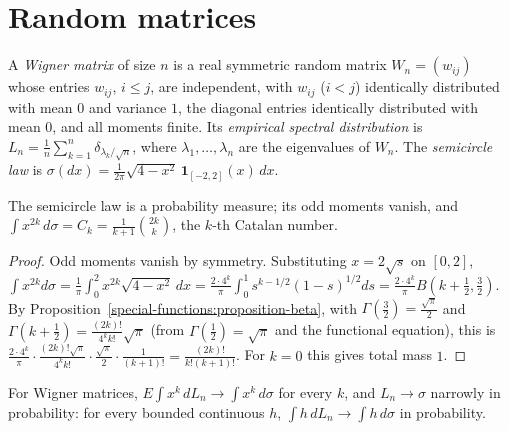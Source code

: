 \section{Random matrices}\label{probability:section-random-matrices}

\begin{definition}\label{probability:definition-wigner}
A \emph{Wigner matrix} of size $n$ is a real symmetric random matrix $W_n = (w_{ij})$ whose entries $w_{ij}$, $i \leq j$, are independent, with $w_{ij}$ ($i < j$) identically distributed with mean $0$ and variance $1$, the diagonal
entries identically distributed with mean $0$, and all moments finite. Its \emph{empirical spectral distribution} is $L_n = \frac1n\sum_{k=1}^n\delta_{\lambda_k/\sqrt n}$, where $\lambda_1, \ldots, \lambda_n$ are the eigenvalues of $W_n$.
The \emph{semicircle law} is $\sigma(dx) = \frac{1}{2\pi}\sqrt{4 - x^2}\,\mathbf{1}_{[-2,2]}(x)\,dx$.
\end{definition}

\begin{proposition}\label{probability:proposition-semicircle-moments}
The semicircle law is a probability measure; its odd moments vanish, and $\int x^{2k}\,d\sigma = C_k = \frac{1}{k + 1}\binom{2k}{k}$, the $k$-th Catalan number.
\end{proposition}

\begin{proof}
Odd moments vanish by symmetry. Substituting $x = 2\sqrt s$ on $[0, 2]$,
$\int x^{2k}d\sigma = \frac1\pi\int_0^2x^{2k}\sqrt{4 - x^2}\,dx = \frac{2\cdot 4^k}{\pi}\int_0^1s^{k-1/2}(1 - s)^{1/2}ds = \frac{2\cdot 4^k}{\pi}B(k + \tfrac12, \tfrac32)$. By Proposition~\ref{special-functions:proposition-beta}, with
$\Gamma(\frac32) = \frac{\sqrt\pi}{2}$ and $\Gamma(k + \frac12) = \frac{(2k)!}{4^kk!}\sqrt\pi$ (from $\Gamma(\frac12) = \sqrt\pi$ and the functional equation), this is
$\frac{2\cdot 4^k}{\pi}\cdot\frac{(2k)!\sqrt\pi}{4^kk!}\cdot\frac{\sqrt\pi}{2}\cdot\frac{1}{(k + 1)!} = \frac{(2k)!}{k!(k + 1)!}$. For $k = 0$ this gives total mass $1$.
\end{proof}

\begin{theorem}\label{probability:theorem-wigner}
For Wigner matrices, $E\int x^k\,dL_n \to \int x^k\,d\sigma$ for every $k$, and $L_n \to \sigma$ narrowly in probability: for every bounded continuous $h$, $\int h\,dL_n \to \int h\,d\sigma$ in probability.
\end{theorem}

